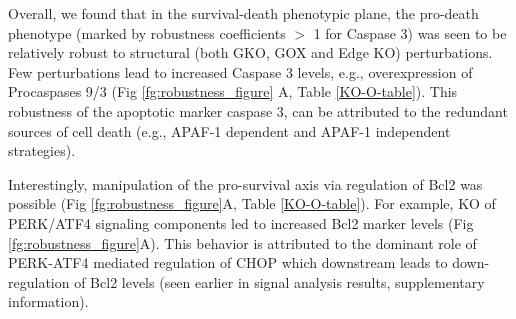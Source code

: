 \documentclass[fleqn,10pt]{wlscirep}
\begin{document}
Overall, we found that in the survival-death phenotypic plane, the pro-death phenotype (marked by robustness coefficients $>$ 1 for Caspase 3) was seen to be relatively robust to structural (both GKO, GOX and Edge KO) perturbations. Few perturbations lead to increased Caspase 3 levels, e.g., overexpression of Procaspases 9/3 (Fig \ref{fg:robustness_figure} A, Table \ref{KO-O-table}). This robustness of the apoptotic marker caspase 3, can be attributed to the redundant sources of cell death (e.g., APAF-1 dependent and APAF-1 independent strategies). 
\iffalse To confirm this we ran simulated APAF-1 KOs over the entire ensemble (supplementary materials Fig. S\ref{fg:COUP_S1}). We found that there were two populations of cells in the ensemble: population 1 where APAF-1 was the dominant regulator of cell-death (marked by enhanced reduction in caspase 3 upon APAF-1 KO) and population 2 where APAF-1 is not the most dominant regulator (marked by reduced effect on Caspase 3 upon APAF-1 KO) (supplementary materials Fig. S\ref{fg:COUP_S1}). This behavior is consistent based on the training data from Sak2 cells (APAF-1 $-ve$ cells) \cite{rao2002cer}. 
\fi 
Interestingly, manipulation of the pro-survival axis via regulation of Bcl2 was possible (Fig \ref{fg:robustness_figure}A, Table \ref{KO-O-table}). For example, KO of PERK/ATF4 signaling components led to increased Bcl2 marker levels (Fig \ref{fg:robustness_figure}A). This behavior is attributed to the dominant role of PERK-ATF4 mediated regulation of CHOP which downstream leads to down-regulation of Bcl2 levels (seen earlier in signal analysis results, supplementary information). 
\end{document}
